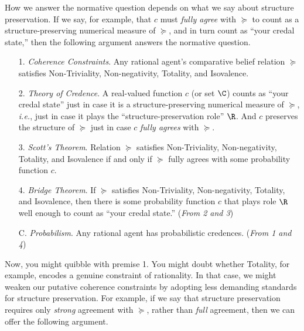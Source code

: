 How we answer the normative question depends on what we say about structure preservation. If we say, for example, that $c$ must \textit{fully agree} with $\succeq$ to count as a structure-preserving numerical measure of $\succeq$, and in turn count as ``your credal state,'' then the following argument answers the normative question.
\begin{enumerate}
\item[1.] \textit{Coherence Constraints}. Any rational agent's comparative belief relation $\succeq$ satisfies Non-Triviality, Non-negativity, Totality, and Isovalence.
\item[2.] \textit{Theory of Credence}. A real-valued function $c$ (or set $\C$) counts as ``your credal state'' just in case it is a structure-preserving numerical measure of $\succeq$, \textit{i.e.}, just in case it plays the ``structure-preservation role'' $\R$. And $c$ preserves the structure of $\succeq$ just in case $c$ \textit{fully agrees} with $\succeq$.	
\item[3.] \textit{Scott's Theorem}. Relation $\succeq$ satisfies Non-Triviality, Non-negativity, Totality, and Isovalence if and only if $\succeq$ fully agrees with some probability function $c$.
\item[4.] \textit{Bridge Theorem}. If $\succeq$ satisfies Non-Triviality, Non-negativity, Totality, and Isovalence, then there is some probability function $c$ that plays role $\R$ well enough to count as ``your credal state.'' (\textit{From 2 and 3})
\item[C.] \textit{Probabilism}. Any rational agent has probabilistic credences. (\textit{From 1 and 4})
\end{enumerate}
Now, you might quibble with premise 1. You might doubt whether Totality, for example, encodes a genuine constraint of rationality. In that case, we might weaken our putative coherence constraints by adopting less demanding standards for structure preservation. For example, if we say that structure preservation requires only \textit{strong} agreement with $\succeq$, rather than \textit{full} agreement, then we can offer the following argument.

